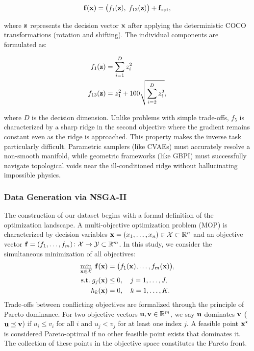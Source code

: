\begin{equation}
    \mathbf{f}(\mathbf{x}) = \big(f_1(\mathbf{z}),\; f_{13}(\mathbf{z})\big) + \mathbf{f}_{\mathrm{opt}},
\end{equation}

where $\mathbf{z}$ represents the decision vector $\mathbf{x}$ after applying the deterministic COCO transformations (rotation and shifting). The individual components are formulated as:

\begin{align}
    f_{1}(\mathbf{z}) &= \sum_{i = 1}^{D} z_i^2 \\
    f_{13}(\mathbf{z}) &= z_1^2 + 100 \sqrt{\sum_{i = 2}^{D} z_i^2},
\end{align}

where $D$ is the decision dimension. Unlike problems with simple trade-offs, $f_5$ is characterized by a sharp ridge in the second objective where the gradient remains constant even as the ridge is approached. This property makes the inverse task particularly difficult. Parametric samplers (like CVAEs) must accurately resolve a non-smooth manifold, while geometric frameworks (like GBPI) must successfully navigate topological voids near the ill-conditioned ridge without hallucinating impossible physics.

\subsubsection{Data Generation via NSGA-II}

The construction of our dataset begins with a formal definition of the optimization landscape. A multi-objective optimization problem (MOP) is characterized by decision variables $\mathbf{x}=(x_1,\dots,x_n)\in\mathcal{X}\subset\mathbb{R}^n$ and an objective vector $\mathbf{f}=(f_1,\dots,f_m)\colon \mathcal{X}\to\mathcal{Y}\subset\mathbb{R}^m$. In this study, we consider the simultaneous minimization of all objectives:
\begin{align}
\min_{\mathbf{x}\in\mathcal{X}}\; \mathbf{f}(\mathbf{x}) &= \big(f_1(\mathbf{x}),\dots,f_m(\mathbf{x})\big),\\
\text{s.t.}\; g_j(\mathbf{x}) &\le 0,\quad j=1,\dots,J,\\
h_k(\mathbf{x}) &= 0,\quad k=1,\dots,K.
\label{eq:mop}
\end{align}
Trade-offs between conflicting objectives are formalized through the principle of Pareto dominance. For two objective vectors $\mathbf{u},\mathbf{v}\in\mathbb{R}^m$, we say $\mathbf{u}$ dominates $\mathbf{v}$ ($\mathbf{u}\preceq\mathbf{v}$) if $u_i\le v_i$ for all $i$ and $u_j < v_j$ for at least one index $j$. A feasible point $\mathbf{x}^\star$ is considered Pareto-optimal if no other feasible point exists that dominates it. The collection of these points in the objective space constitutes the Pareto front.

